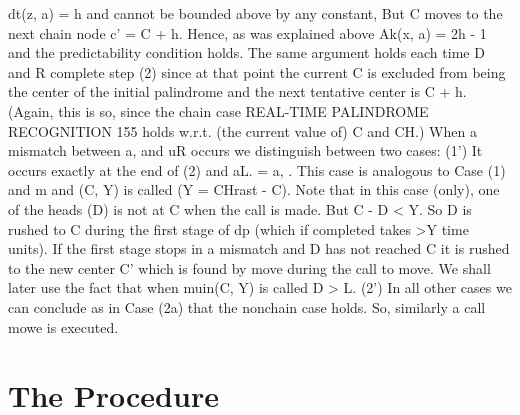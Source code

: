 \documentclass[11pt,a4paper]{report}
\begin{document}
dt(z, a) = h and cannot be bounded above by any constant, But C moves to the next
chain node c’ = C + h. Hence, as was explained above Ak(x, a) = 2h - 1 and the
predictability condition holds. The same argument holds each time D and R complete
step (2) since at that point the current C is excluded from being the center of the initial
palindrome and the next tentative center is C + h. (Again, this is so, since the chain case 
REAL-TIME PALINDROME RECOGNITION 155
holds w.r.t. (the current value of) C and CH.) When a mismatch between a, and uR
occurs we distinguish between two cases:
(1’) It occurs exactly at the end of (2) and aL. = a, . This case is analogous to
Case (1) and m and (C, Y) is called (Y = CHrast - C). Note that in this case (only), one
of the heads (D) is not at C when the call is made. But C - D < Y. So D is rushed to C
during the first stage of dp (which if completed takes >Y time units). If the first stage
stops in a mismatch and D has not reached C it is rushed to the new center C’ which is
found by move during the call to move. We shall later use the fact that when muin(C, Y)
is called D > L.
(2’) In all other cases we can conclude as in Case (2a) that the nonchain case holds.
So, similarly a call mowe is executed. 

\chapter{The Procedure}
\end{document}
